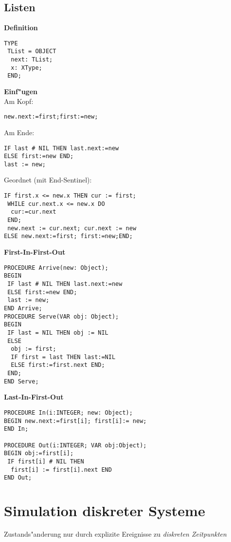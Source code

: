 \documentclass[10pt, a4paper, twocolumn]{scrartcl}
\begin{document}
\subsection{Listen}

{\bf Definition}\\
\begin{verbatim}
TYPE
 TList = OBJECT
  next: TList;
  x: XType;
 END;
\end{verbatim}

{\bf Einf"ugen}\\
Am Kopf:
\begin{verbatim}
new.next:=first;first:=new;
\end{verbatim}

Am Ende:
\begin{verbatim}
IF last # NIL THEN last.next:=new
ELSE first:=new END;
last := new;
\end{verbatim}

Geordnet (mit End-Sentinel):
\begin{verbatim}
IF first.x <= new.x THEN cur := first;
 WHILE cur.next.x <= new.x DO 
  cur:=cur.next
 END;
 new.next := cur.next; cur.next := new
ELSE new.next:=first; first:=new;END;
\end{verbatim}

{\bf First-In-First-Out}\\
\begin{verbatim}
PROCEDURE Arrive(new: Object);
BEGIN
 IF last # NIL THEN last.next:=new 
 ELSE first:=new END;
 last := new;
END Arrive;
PROCEDURE Serve(VAR obj: Object);
BEGIN
 IF last = NIL THEN obj := NIL
 ELSE 
  obj := first;
  IF first = last THEN last:=NIL 
  ELSE first:=first.next END;
 END;
END Serve;
\end{verbatim}

{\bf Last-In-First-Out}
\begin{verbatim}
PROCEDURE In(i:INTEGER; new: Object);
BEGIN new.next:=first[i]; first[i]:= new;
END In;

PROCEDURE Out(i:INTEGER; VAR obj:Object);
BEGIN obj:=first[i];
 IF first[i] # NIL THEN 
  first[i] := first[i].next END
END Out;
\end{verbatim}

\section{Simulation diskreter Systeme}

Zustands"anderung nur durch explizite Ereignisse zu {\it diskreten Zeitpunkten}
\end{document}
